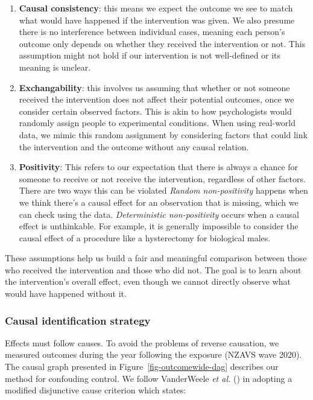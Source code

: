 \documentclass[
  singlecolumn,
  9pt]{article}
\begin{document}
\begin{enumerate}
\def\labelenumi{\arabic{enumi}.}
\item
  \textbf{Causal consistency}: this means we expect the outcome we see
  to match what would have happened if the intervention was given. We
  also presume there is no interference between individual cases,
  meaning each person's outcome only depends on whether they received
  the intervention or not. This assumption might not hold if our
  intervention is not well-defined or its meaning is unclear.
\item
  \textbf{Exchangability}: this involves us assuming that whether or not
  someone received the intervention does not affect their potential
  outcomes, once we consider certain observed factors. This is akin to
  how psychologists would randomly assign people to experimental
  conditions. When using real-world data, we mimic this random
  assignment by considering factors that could link the intervention and
  the outcome without any causal relation.
\item
  \textbf{Positivity}: This refers to our expectation that there is
  always a chance for someone to receive or not receive the
  intervention, regardless of other factors. There are two ways this can
  be violated \emph{Random non-positivity} happens when we think there's
  a causal effect for an observation that is missing, which we can check
  using the data. \emph{Deterministic non-positivity} occurs when a
  causal effect is unthinkable. For example, it is generally impossible
  to consider the causal effect of a procedure like a hysterectomy for
  biological males.
\end{enumerate}

These assumptions help us build a fair and meaningful comparison between
those who received the intervention and those who did not. The goal is
to learn about the intervention's overall effect, even though we cannot
directly observe what would have happened without it.

\subsubsection{Causal identification
strategy}\label{causal-identification-strategy}

Effects must follow causes. To avoid the problems of reverse causation,
we measured outcomes during the year following the exposure (NZAVS wave
2020). The causal graph presented in Figure~\ref{fig-outcomewide-dag}
describes our method for confouding control. We follow VanderWeele
\emph{et al.} () in adopting a
modified disjunctive cause criterion which states:
\end{document}
